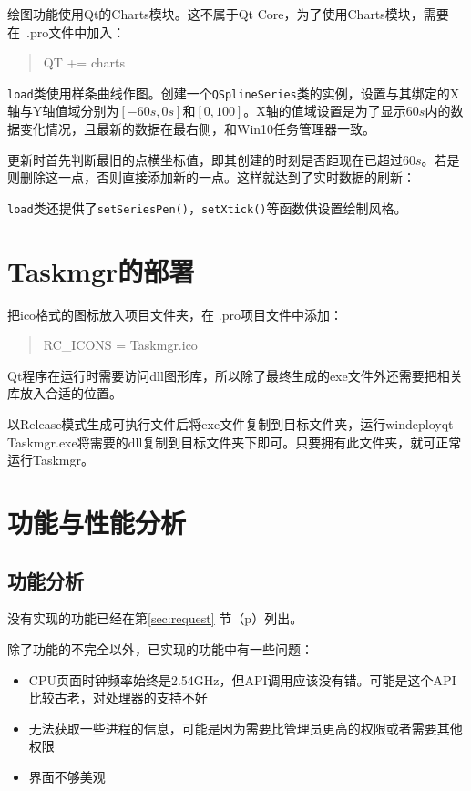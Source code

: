 \documentclass[UTF8,twoside,titlepage]{ctexart}
\newcommand\code[1]{\texttt{#1}}
\begin{document}
绘图功能使用Qt的Charts模块。这不属于Qt Core，为了使用Charts模块，需要在\ .pro文件中加入：

\begin{quote}
    \ttfamily
    QT += charts
\end{quote}

\code{load}类使用样条曲线作图。创建一个\code{QSplineSeries}类的实例，设置与其绑定的X轴与Y轴值域分别为$[-60s,0s]$和$[0,100]$。X轴的值域设置是为了显示$60s$内的数据变化情况，且最新的数据在最右侧，和Win10任务管理器一致。

更新时首先判断最旧的点横坐标值，即其创建的时刻是否距现在已超过$60s$。若是则删除这一点，否则直接添加新的一点。这样就达到了实时数据的刷新：

{
    \ttfamily
    
}

\code{load}类还提供了\code{setSeriesPen()}，\code{setXtick()}等函数供设置绘制风格。

\section{Taskmgr的部署}
把ico格式的图标放入项目文件夹，在 .pro项目文件中添加：
\begin{quote}
    \ttfamily
    RC\_ICONS = Taskmgr.ico
\end{quote}

Qt程序在运行时需要访问dll图形库，所以除了最终生成的exe文件外还需要把相关库放入合适的位置。

以Release模式生成可执行文件后将exe文件复制到目标文件夹，运行windeployqt Taskmgr.exe将需要的dll复制到目标文件夹下即可。只要拥有此文件夹，就可正常运行Taskmgr。

\section{功能与性能分析}
\label{sec:analyze}
\subsection{功能分析}
没有实现的功能已经在第\ref{sec:request} 节（p\pageref{sec:request}）列出。

除了功能的不完全以外，已实现的功能中有一些问题：
\begin{itemize}
    \item CPU页面时钟频率始终是2.54GHz，但API调用应该没有错。可能是这个API比较古老，对处理器的支持不好
    \item 无法获取一些进程的信息，可能是因为需要比管理员更高的权限或者需要其他权限
    \item 界面不够美观
\end{itemize}
\end{document}
